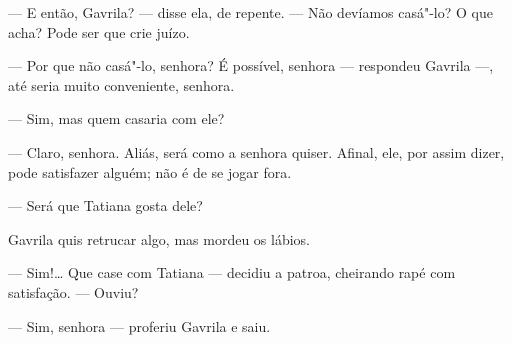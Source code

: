 --- E então, Gavrila? --- disse ela, de repente. --- Não devíamos
casá"-lo? O que acha? Pode ser que crie juízo.

--- Por que não casá"-lo, senhora? É possível, senhora --- respondeu
Gavrila ---, até seria muito conveniente, senhora.

--- Sim, mas quem casaria com ele?

--- Claro, senhora. Aliás, será como a senhora quiser. Afinal, ele, por
assim dizer, pode satisfazer alguém; não é de se jogar fora.

--- Será que Tatiana gosta dele?

Gavrila quis retrucar algo, mas mordeu os lábios.

--- Sim!\ldots{} Que case com Tatiana --- decidiu a patroa, cheirando rapé
com satisfação. --- Ouviu?

--- Sim, senhora --- proferiu Gavrila e saiu.


